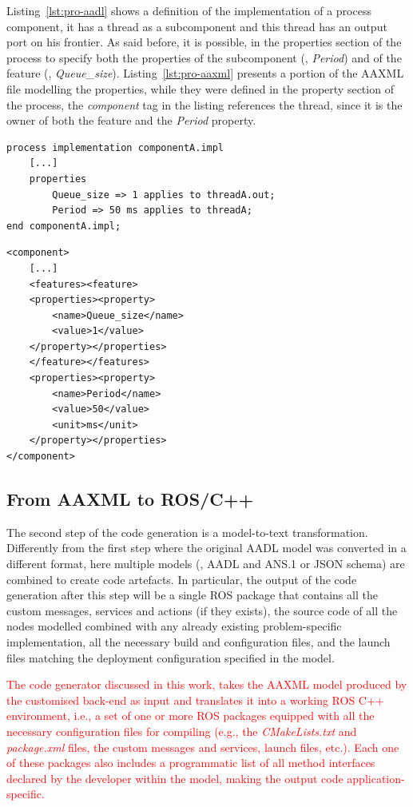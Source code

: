 Listing~\ref{lst:pro-aadl} shows a definition of the implementation of a process component, it has a thread as a subcomponent and this thread has an output port on his frontier. As said before, it is possible, in the properties section of the process to specify both the properties of the subcomponent (\ie, \textit{Period}) and of the feature (\ie, \textit{Queue\_size}). Listing~\ref{lst:pro-aaxml} presents a portion of the AAXML file modelling the properties, while they were defined in the property section of the process, the \textit{component} tag in the listing references the thread, since it is the owner of both the feature and the \textit{Period} property. 

\begin{lstlisting}[frame=tb,caption={TODO caption},label=lst:pro-aadl]
process implementation componentA.impl
	[...]
	properties
		Queue_size => 1 applies to threadA.out;
		Period => 50 ms applies to threadA;
end componentA.impl;
\end{lstlisting}

\begin{lstlisting}[frame=tb,caption={TODO caption},label=lst:pro-aaxml]
<component>
	[...]
	<features><feature>
	<properties><property>
		<name>Queue_size</name>
		<value>1</value>
	</property></properties>
	</feature></features>
	<properties><property>
		<name>Period</name>
		<value>50</value>
		<unit>ms</unit>
	</property></properties>
</component>
\end{lstlisting}

\subsection{From AAXML to ROS/C++}
\label{sec:xml-cpp}
The second step of the code generation is a model-to-text transformation. Differently from the first step where the original AADL model was converted in a different format, here multiple models (\ie, AADL and ANS.1 or JSON schema) are combined to create code artefacts. In particular, the output of the code generation after this step will be a single ROS package that contains all the custom messages, services and actions (if they exists), the source code of all the nodes modelled combined with any already existing problem-specific implementation, all the necessary build and configuration files, and the launch files matching the deployment configuration specified in the model.





\textcolor{red}{
The code generator discussed in this work, takes the AAXML model produced by the customised back-end as input and translates it into a working ROS C++ environment, i.e., a set of one or more ROS packages equipped with all the necessary configuration files for compiling (e.g., the \textit{CMakeLists.txt} and \textit{package.xml} files, the custom messages and services, launch files, etc.). Each one of these packages also includes a programmatic list of all method interfaces declared by the developer within the model, making the output code application-specific.}

